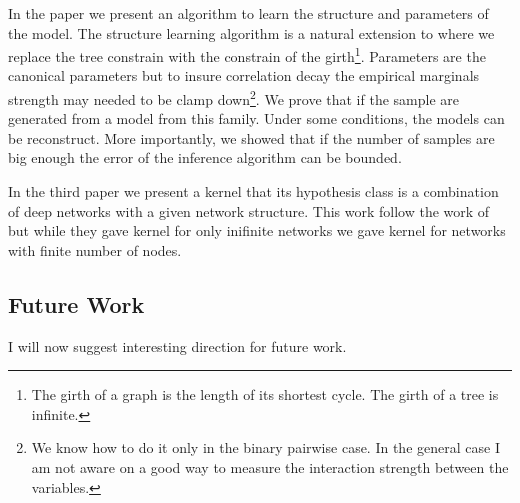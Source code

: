 In the paper we present an algorithm to learn the structure and parameters of the model.
The structure learning algorithm is a natural extension to \cite{chowLiu} where we replace the tree constrain with the constrain of the girth\footnote{The girth of a graph is the length of its shortest cycle. The girth of a tree is infinite.}.
Parameters are the canonical parameters but to insure correlation decay the empirical marginals strength may needed to be clamp down\footnote{We know how to do it only in the binary pairwise case. In the general case I am not aware on a good way to measure the interaction strength between the variables.}.
We prove that if the sample are generated from a model from this family.
Under some conditions, the models can be reconstruct.
More importantly, we showed that if the number of samples are big enough the error of the inference algorithm can be bounded.

In the third paper  we present a kernel that its hypothesis class is a combination of deep networks with a given network structure. This work follow the work of \cite{cho2009kernel} but while they gave kernel for only inifinite networks we gave kernel for networks with finite number of nodes.

\subsection{Future Work}
I will now suggest interesting direction for future work.

